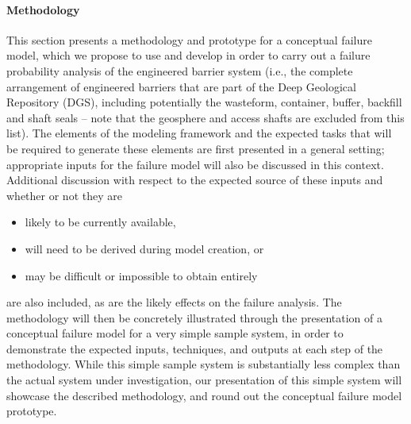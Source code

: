 \paragraph{Methodology} This section presents a methodology and prototype for a conceptual failure model, which we propose to use and develop in order to carry out a failure probability analysis of the engineered barrier system (i.e., the complete arrangement of engineered barriers that are part of the Deep Geological Repository (DGS), including potentially the wasteform, container, buffer, backfill and shaft seals -- note that the geosphere and access shafts are excluded from this list).\newpage\noindent
The elements of the modeling framework and the expected tasks that will be required to generate these elements are first presented in a general setting; appropriate inputs for the failure model will also be discussed in this context. Additional discussion with respect to the expected source of these inputs and whether or not they are 
\begin{itemize}[noitemsep]
\item likely to be currently available, 
\item will need to be derived during model creation, or 
\item may be difficult or impossible to obtain entirely
\end{itemize}
are also included, as are the likely effects on the failure analysis. 
\newl
The methodology will then be concretely illustrated through the presentation of a conceptual failure model for a very simple sample system, in order to demonstrate the expected inputs, techniques, and outputs at each step of the methodology. While this simple sample system is substantially less complex than the actual system under investigation, our presentation of this simple system will showcase the described methodology, and round out the conceptual failure model prototype.

